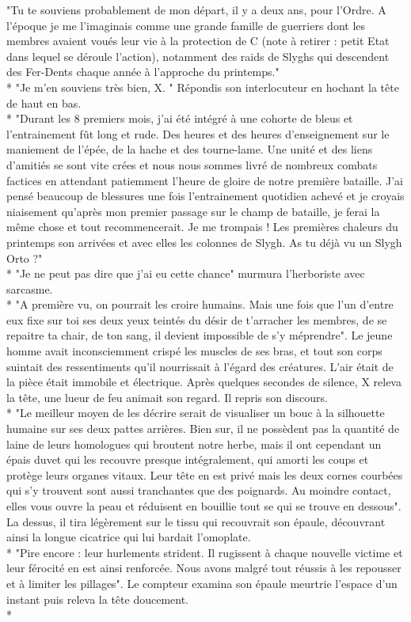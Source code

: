 \documentclass{book}
\begin{document}
"Tu te souviens probablement de mon départ, il y a deux ans, pour l'Ordre. A l'époque je me  l'imaginais comme une grande famille de guerriers dont les membres avaient voués leur vie à la protection de C (note à retirer : petit Etat dans lequel se déroule l'action), notamment des raids de Slyghs qui descendent des Fer-Dents chaque année à l'approche du printemps." \\*
"Je m'en souviens très bien, X. " Répondis son interlocuteur en hochant la tête de haut en bas.\\*
"Durant les 8 premiers mois, j'ai été intégré à une cohorte de bleus et l'entrainement fût long et rude. Des heures et des heures d'enseignement sur le maniement de l'épée, de la hache et des tourne-lame. Une unité et des liens d'amitiés se sont vite crées et nous nous sommes livré de nombreux combats factices en attendant patiemment l'heure de gloire de notre première bataille. J'ai pensé beaucoup de blessures une fois l'entrainement quotidien achevé et je croyais niaisement qu'après mon premier passage sur le champ de bataille, je ferai la même chose et tout recommencerait. Je me trompais ! Les premières chaleurs du printemps son arrivées et avec elles les colonnes de Slygh. As tu déjà vu un Slygh Orto ?" \\*
"Je ne peut pas dire que j'ai eu cette chance" murmura l'herboriste avec sarcasme. \\*
"A première vu, on pourrait les croire humains. Mais une fois que l'un d'entre eux fixe sur toi ses deux yeux teintés du désir de t'arracher les membres, de se repaitre ta chair, de ton sang, il devient impossible de s'y méprendre". Le jeune homme avait inconsciemment crispé les muscles de ses bras, et tout son corps  suintait des ressentiments qu'il nourrissait à l'égard des créatures.
L'air était de la pièce était immobile et électrique. Après quelques secondes de silence, X releva la tête, une lueur de feu animait son regard. Il repris son discours.\\*
"Le meilleur moyen de les décrire serait de visualiser un bouc à la silhouette humaine sur ses deux pattes arrières. Bien sur, il ne possèdent pas la quantité de laine de leurs homologues qui broutent notre herbe, mais il ont cependant un épais duvet qui les recouvre presque intégralement, qui amorti les coups et protège leurs organes vitaux. Leur tête en est privé mais les deux cornes courbées qui s'y trouvent sont aussi tranchantes que des poignards. Au moindre contact, elles vous ouvre la peau et réduisent en bouillie tout se qui se trouve en dessous".
La dessus, il tira légèrement sur le tissu qui recouvrait son épaule, découvrant ainsi la longue cicatrice qui lui bardait l’omoplate.\\*
"Pire encore : leur hurlements strident. Il rugissent à chaque nouvelle victime et leur férocité en est ainsi renforcée. Nous avons malgré tout réussis à les repousser et à limiter les pillages". Le compteur examina son épaule meurtrie l'espace d'un instant puis releva la tête doucement. \\*
\end{document}
